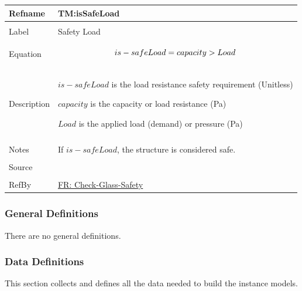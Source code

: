 \documentclass[12pt]{article}
\newcommand{\gt}{\ensuremath >}
\begin{document}
\begin{minipage}{\textwidth}
\begin{tabular}{>{\raggedright}p{}>{\raggedright\arraybackslash}p{}}
\toprule \textbf{Refname} & \textbf{TM:isSafeLoad}
\label{TM:isSafeLoad}
\\ \midrule \\
Label & Safety Load
        
\\ \midrule \\
Equation & \begin{displaymath}
           is-safeLoad=capacity\gt{}Load
           \end{displaymath}
\\ \midrule \\
Description & \begin{symbDescription}
              \item{$is-safeLoad$ is the load resistance safety requirement (Unitless)}
              \item{$capacity$ is the capacity or load resistance (Pa)}
              \item{$Load$ is the applied load (demand) or pressure (Pa)}
              \end{symbDescription}
\\ \midrule \\
Notes & If $is-safeLoad$, the structure is considered safe.
        
\\ \midrule \\
Source & \cite{astm2009}
         
\\ \midrule \\
RefBy & \hyperref[checkGlassSafety]{FR: Check-Glass-Safety}
        
\\ \bottomrule
\end{tabular}
\end{minipage}
\subsubsection{General Definitions}
\label{Sec:GDs}
There are no general definitions.

\subsubsection{Data Definitions}
\label{Sec:DDs}
This section collects and defines all the data needed to build the instance models.
\end{document}
